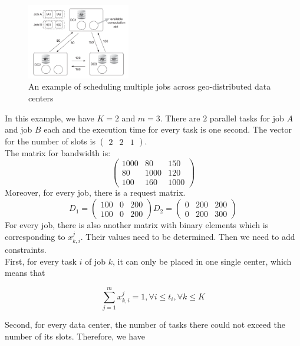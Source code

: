 \documentclass{llncs}
\begin{document}
\begin{figure}[h]
    \centering
    \includegraphics[width=0.4\textwidth]{img/simpleexample.png}
    \caption{An example of scheduling multiple jobs across geo-distributed data centers\cite{Chen2019}}
    \label{fig:azure}
\end{figure}

In this example, we have $K=2$ and $m=3$. There are $2$ parallel tasks for job $A$ and job $B$ each and the execution time for every task is one second. The vector for the number of slots is $\begin{pmatrix}2 & 2 & 1\end{pmatrix}$.\\
The matrix for bandwidth is:
$$\begin{pmatrix}
1000 & 80 & 150 \\
80 & 1000 & 120 \\
100 & 160 & 1000
\end{pmatrix}$$
Moreover, for every job, there is a request matrix.\\
$$D_1=\begin{pmatrix}
100 & 0 & 200 \\
100 & 0 & 200 
\end{pmatrix}
D_2=\begin{pmatrix}
0 & 200 & 200 \\
0 & 200 & 300 
\end{pmatrix}$$
For every job, there is also another matrix with binary elements which is corresponding to $x_{k,i}^j$. Their values need to be determined. Then we need to add constraints.\\
First, for every task $i$ of job $k$, it can only be placed in one single center, which means that 

\begin{equation}\label{eq:one}
    \sum_{j=1}^m x_{k,i}^j=1,\forall i\leq t_i,\forall k\leq K
\end{equation}

Second, for every data center, the number of tasks there could not exceed the number of its slots. Therefore, we have 
\end{document}
